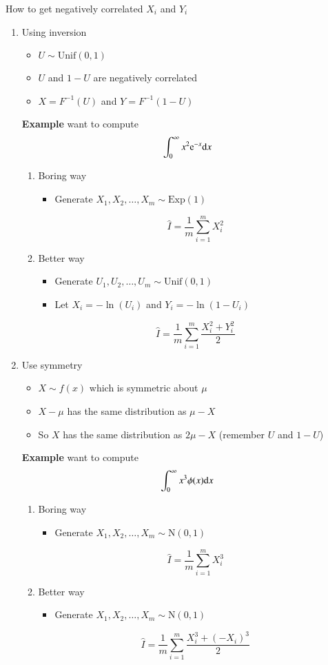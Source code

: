 \documentclass[11pt,english]{scrbook}
\begin{document}
How to get negatively correlated \(X_{i}\) and \(Y_{i}\)
\begin{enumerate}
\item Using inversion
\begin{itemize}
\item \(U \sim \mathrm{Unif}(0,1)\)
\item \(U\) and \(1-U\) are negatively correlated
\item \(X = F^{-1}(U)\) and \(Y = F^{-1}(1 - U)\)
\end{itemize}
\textbf{Example}  want to compute
\[
   \int_{0}^{\infty}x^{2}\mathrm{e}^{-x} \mathrm{d} x
   \]
\begin{enumerate}
\item Boring way
\begin{itemize}
\item Generate  \(X_{1},X_{2},\ldots,X_{m}\sim \mathrm{Exp}(1)\)
\end{itemize}
\[
      \hat{I}=\frac{1}{m} \sum_{i = 1}^{m}X_{i}^{2}
      \]
\item Better way
\begin{itemize}
\item Generate  \(U_{1},U_{2},\ldots,U_{m}\sim \mathrm{Unif}(0,1)\)
\item Let \(X_{i} = -\ln(U_{i})\) and \(Y_{i} = -\ln(1 - U_{i})\)
\end{itemize}
\[
      \hat{I}=\frac{1}{m} \sum_{i = 1}^{m}\frac{X_{i}^{2} + Y_{i}^{2}}{2}
      \]
\end{enumerate}

\item Use symmetry
\begin{itemize}
\item \(X \sim f(x)\) which is symmetric about \(\mu\)
\item \(X - \mu\) has the same distribution as \(\mu - X\)
\item So \(X\) has the same distribution as \(2\mu - X\) (remember \(U\) and \(1 - U\))
\end{itemize}
\textbf{Example}  want to compute
\[
   \int_{0}^{\infty}x^{3}\phi(x) \mathrm{d} x
   \]
\begin{enumerate}
\item Boring way
\begin{itemize}
\item Generate  \(X_{1},X_{2},\ldots,X_{m}\sim \mathrm{N}(0,1)\)
\end{itemize}
\[
      \hat{I}=\frac{1}{m} \sum_{i = 1}^{m}X_{i}^{3}
      \]
\item Better way
\begin{itemize}
\item Generate  \(X_{1},X_{2},\ldots,X_{m}\sim \mathrm{N}(0,1)\)
\end{itemize}
\[
      \hat{I}=\frac{1}{m} \sum_{i = 1}^{m}\frac{X_{i}^{3} + (-X_{i})^{3}}{2}
      \]
\end{enumerate}
\end{enumerate}
\end{document}
